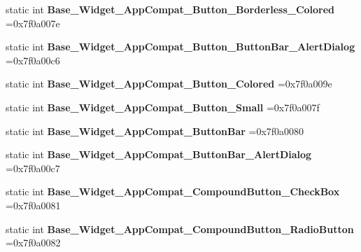 \begin{DoxyCompactItemize}
static int {\bfseries Base\+\_\+\+Widget\+\_\+\+App\+Compat\+\_\+\+Button\+\_\+\+Borderless\+\_\+\+Colored} =0x7f0a007e
\item 
\mbox{\label{classandroid_1_1support_1_1design_1_1R_1_1style_a76cd8f5d1c2a70368c1f0fadb1cd3bee}} 
static int {\bfseries Base\+\_\+\+Widget\+\_\+\+App\+Compat\+\_\+\+Button\+\_\+\+Button\+Bar\+\_\+\+Alert\+Dialog} =0x7f0a00c6
\item 
\mbox{\label{classandroid_1_1support_1_1design_1_1R_1_1style_ad44e738562e6b821ebbc966e1e704140}} 
static int {\bfseries Base\+\_\+\+Widget\+\_\+\+App\+Compat\+\_\+\+Button\+\_\+\+Colored} =0x7f0a009e
\item 
\mbox{\label{classandroid_1_1support_1_1design_1_1R_1_1style_a9b2e5696e284e82768e04beae2d3da29}} 
static int {\bfseries Base\+\_\+\+Widget\+\_\+\+App\+Compat\+\_\+\+Button\+\_\+\+Small} =0x7f0a007f
\item 
\mbox{\label{classandroid_1_1support_1_1design_1_1R_1_1style_a6b6d072e399fb78c8664c913e66db93a}} 
static int {\bfseries Base\+\_\+\+Widget\+\_\+\+App\+Compat\+\_\+\+Button\+Bar} =0x7f0a0080
\item 
\mbox{\label{classandroid_1_1support_1_1design_1_1R_1_1style_a300a702dd8ccb2127942cff73158bb8b}} 
static int {\bfseries Base\+\_\+\+Widget\+\_\+\+App\+Compat\+\_\+\+Button\+Bar\+\_\+\+Alert\+Dialog} =0x7f0a00c7
\item 
\mbox{\label{classandroid_1_1support_1_1design_1_1R_1_1style_a862b19febac6fdf6a456455984971fdf}} 
static int {\bfseries Base\+\_\+\+Widget\+\_\+\+App\+Compat\+\_\+\+Compound\+Button\+\_\+\+Check\+Box} =0x7f0a0081
\item 
\mbox{\label{classandroid_1_1support_1_1design_1_1R_1_1style_ab0d8325144cd3f695ecb9dcd87cdbdaa}} 
static int {\bfseries Base\+\_\+\+Widget\+\_\+\+App\+Compat\+\_\+\+Compound\+Button\+\_\+\+Radio\+Button} =0x7f0a0082
\item 

\end{DoxyCompactItemize}
